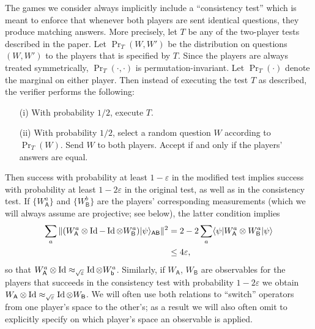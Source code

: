 \documentclass[11pt]{article}
\theoremstyle{remark}
\theoremstyle{definition}
\newcommand{\ket}[1]{|#1\rangle}
\newcommand{\bra}[1]{\langle#1|}
\newcommand{\Id}{\ensuremath{\mathop{\rm Id}\nolimits}}
\newcommand{\reg}[1]{{\textsf{#1}}}
\newcommand{\eps}{\varepsilon}
\begin{document}
The games we consider always implicitly include a ``consistency test'' which is meant to enforce that whenever both players are sent identical questions, they produce matching answers. More precisely, let $T$ be any of the two-player tests described in the paper. Let $\Pr_T(W,W')$ be the distribution on questions $(W,W')$ to the players that is specified by $T$. Since the players are always treated symmetrically, $\Pr_T(\cdot,\cdot)$ is permutation-invariant. Let $\Pr_T(\cdot)$ denote the marginal on either player. Then instead of executing the test $T$ as described, the verifier performs the following:
\begin{enumerate}
\item[(i)] With probability $1/2$, execute $T$.
\item[(ii)] With probability $1/2$, select a random question $W$ according to $\Pr_T(W)$. Send $W$ to both players. Accept if and only if the players' answers are equal. 
\end{enumerate}
Then success with probability at least $1-\eps$ in the modified test implies success with probability at least $1-2\eps$ in the original test, as well as in the consistency test. If $\{W_{\reg{A}}^a\}$ and $\{W_{\reg{B}}^b\}$ are the players' corresponding measurements (which we will always assume are projective; see below), the latter condition implies 
\begin{align}
\sum_a \|(W_{\reg{A}}^a \otimes \Id - \Id \otimes W_{\reg{B}}^a)\ket{\psi}_{\reg{AB}}\|^2 &= 2-2 \sum_a \bra{\psi} W_{\reg{A}}^a \otimes W_{\reg{B}}^a \ket{\psi} \notag\\ 
&\leq 4 \eps,\label{eq:consistency}
\end{align}
so that $W_{\reg{A}}^a \otimes \Id \approx_{\sqrt{\eps}} \Id \otimes W_{\reg{b}}^a$. Similarly, if $W_{\reg{A}}$, $W_{\reg{B}}$ are observables for the players that succeeds in the consistency test with probability $1-2\eps$ we obtain $W_{\reg{A}}\otimes \Id \approx_{\sqrt{\eps}} \Id \otimes W_{\reg{B}}$. We will often use both relations to ``switch'' operators from one player's space to the other's; as a result we will also often omit to  explicitly specify on which player's space an observable is applied. 
\end{document}
